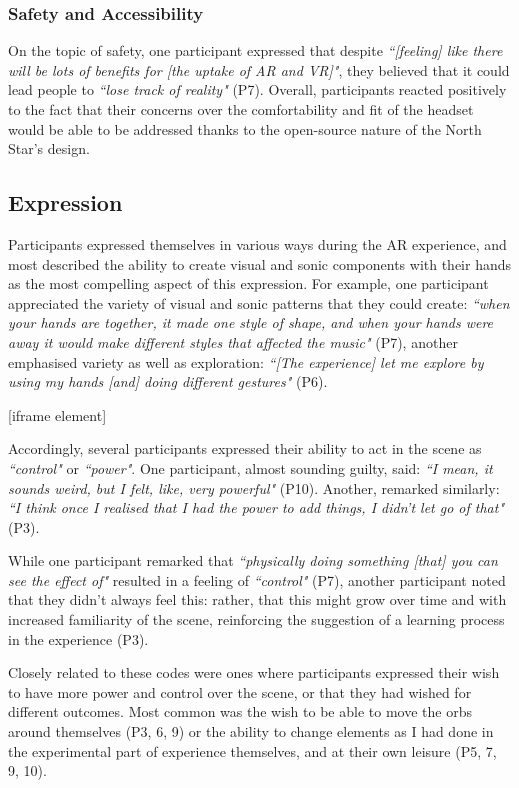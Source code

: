 \subsubsection{Safety and Accessibility}\label{sec: polaris-feedback-adoption-safety}
On the topic of safety, one participant expressed that despite \textit{``[feeling] like there will be lots of benefits for [the uptake of AR and VR]"}, they believed that it could lead people to \textit{``lose track of reality"} (P7). Overall, participants reacted positively to the fact that their concerns over the comfortability and fit of the headset would be able to be addressed thanks to the open-source nature of the North Star’s design.

\subsection{Expression}\label{sec: polaris-feedback-expression}
Participants expressed themselves in various ways during the AR experience, and most described the ability to create visual and sonic components with their hands as the most compelling aspect of this expression. For example, one participant appreciated the variety of visual and sonic patterns that they could create: \textit{``when your hands are together, it made one style of shape, and when your hands were away it would make different styles that affected the music"} (P7), another emphasised variety as well as exploration: \textit{``[The experience] let me explore by using my hands [and] doing different gestures"} (P6).

[iframe element]

Accordingly, several participants expressed their ability to act in the scene as \textit{``control"} or \textit{``power"}. One participant, almost sounding guilty, said: \textit{``I mean, it sounds weird, but I felt, like, very powerful"} (P10). Another, remarked similarly: \textit{``I think once I realised that I had the power to add things, I didn’t let go of that"} (P3).

While one participant remarked that \textit{``physically doing something [that] you can see the effect of"} resulted in a feeling of \textit{``control"} (P7), another participant noted that they didn’t always feel this: rather, that this might grow over time and with increased familiarity of the scene, reinforcing the suggestion of a learning process in the experience (P3).

Closely related to these codes were ones where participants expressed their wish to have more power and control over the scene, or that they had wished for different outcomes. Most common was the wish to be able to move the orbs around themselves (P3, 6, 9) or the ability to change elements as I had done in the experimental part of experience themselves, and at their own leisure (P5, 7, 9, 10).

